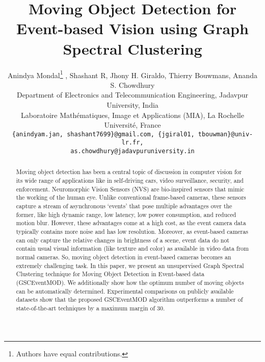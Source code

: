 \documentclass{article}
\title{Moving Object Detection for Event-based Vision using Graph Spectral Clustering}
\author{Anindya Mondal\thanks{Authors have equal contributions.} , Shashant R\footnotemark[1] , Jhony H. Giraldo, Thierry Bouwmans, Ananda S. Chowdhury \\
 Department of Electronics and Telecommunication Engineering, Jadavpur University, India\\
 
Laboratoire Mathématiques, Image et Applications (MIA), La Rochelle Université, France \\
{\tt\small \{anindyam.jan, shashant7699\}@gmail.com, \{jgiral01, tbouwman\}@univ-lr.fr,} \\
{\tt\small as.chowdhury@jadavpuruniversity.in}}
\date{}
\begin{document}
\maketitle

\begin{abstract}
	Moving object detection has been a central topic of discussion in computer vision for its wide range of applications like in self-driving cars, video surveillance, security, and enforcement. Neuromorphic Vision Sensors (NVS) are bio-inspired sensors that mimic the working of the human eye. Unlike conventional frame-based cameras, these sensors capture a stream of asynchronous ‘events’ that pose multiple advantages over the former, like high dynamic range, low latency, low power consumption, and reduced motion blur. However, these advantages come at a high cost, as the event camera data typically contains more noise and has low resolution. Moreover, as event-based cameras can only capture the relative changes in brightness of a scene, event data do not contain usual visual information (like texture and color) as available in video data from normal cameras. So, moving object detection in event-based cameras becomes an extremely challenging task. In this paper, we present an unsupervised Graph Spectral Clustering technique for Moving Object Detection in Event-based data (GSCEventMOD). We additionally show how the optimum number of moving objects can be automatically determined. Experimental comparisons on publicly available datasets show that the proposed GSCEventMOD algorithm outperforms a number of state-of-the-art techniques by a maximum margin of 30. 
\end{abstract}


\end{document}
